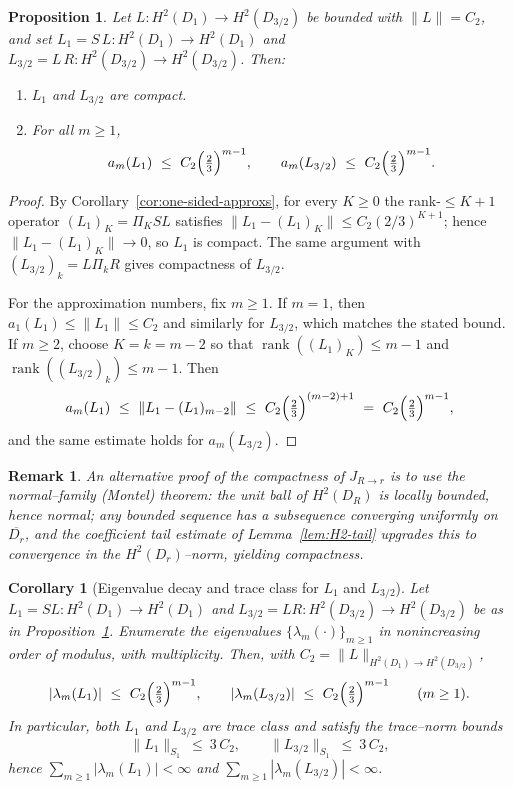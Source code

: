 \documentclass[11pt]{article}
\newtheorem{remark}[definition]{Remark}
\newtheorem{proposition}[definition]{Proposition}
\newtheorem{corollary}[definition]{Corollary}
\begin{document}
\begin{proposition}
\label{prop:L-on-each-space}
Let $L:H^2(D_1)\to H^2(D_{3/2})$ be bounded with $\|L\|=C_2$, and set
$L_{1}=S\,L:H^2(D_1)\to H^2(D_1)$ and $L_{3/2}=L\,R:H^2(D_{3/2})\to H^2(D_{3/2})$.
Then:
\begin{enumerate}
\item $L_{1}$ and $L_{3/2}$ are compact.
\item For all $m\ge1$,
\[
a_m(L_{1})\ \le\ C_2\Bigl(\tfrac{2}{3}\Bigr)^{m-1},
\qquad
a_m(L_{3/2})\ \le\ C_2\Bigl(\tfrac{2}{3}\Bigr)^{m-1}.
\]
\end{enumerate}
\end{proposition}
\begin{proof}
By Corollary~\ref{cor:one-sided-approxs}, for every $K\ge0$ the rank-$\le K+1$
operator $(L_{1})_{K}=\Pi_K S L$ satisfies
$\|L_{1}-(L_{1})_{K}\|\le C_2(2/3)^{K+1}$; hence $\|L_{1}-(L_{1})_{K}\|\to0$,
so $L_{1}$ is compact. The same argument with $(L_{3/2})_{k}=L\Pi_k R$
gives compactness of $L_{3/2}$.

For the approximation numbers, fix $m\ge1$. If $m=1$, then
$a_1(L_{1})\le\|L_{1}\|\le C_2$ and similarly for $L_{3/2}$, which matches the
stated bound. If $m\ge2$, choose $K=k=m-2$ so that
$\operatorname{rank}((L_{1})_{K})\le m-1$ and $\operatorname{rank}((L_{3/2})_{k})\le m-1$.
Then
\[
a_m(L_{1})\ \le\ \|L_{1}-(L_{1})_{m-2}\|
\ \le\ C_2\Bigl(\tfrac{2}{3}\Bigr)^{(m-2)+1}
\ =\ C_2\Bigl(\tfrac{2}{3}\Bigr)^{m-1},
\]
and the same estimate holds for $a_m(L_{3/2})$.
\end{proof}

\begin{remark}
An alternative proof of the compactness of $J_{R\to r}$ is to use the normal–family
(Montel) theorem: the unit ball of $H^2(D_R)$ is locally bounded, hence normal; any
bounded sequence has a subsequence converging uniformly on $\overline{D_r}$, and the
coefficient tail estimate of Lemma~\ref{lem:H2-tail} upgrades this to convergence in
the $H^2(D_r)$–norm, yielding compactness.
\end{remark}

\begin{corollary}[Eigenvalue decay and trace class for $L_{1}$ and $L_{3/2}$]
\label{cor:eig-decay-traceclass}
Let $L_{1}=SL:H^2(D_1)\to H^2(D_1)$ and $L_{3/2}=LR:H^2(D_{3/2})\to H^2(D_{3/2})$
be as in Proposition~\ref{prop:L-on-each-space}. Enumerate the eigenvalues
$\{\lambda_m(\cdot)\}_{m\ge1}$ in nonincreasing order of modulus, with multiplicity.
Then, with $C_2=\|L\|_{H^2(D_1)\to H^2(D_{3/2})}$,
\[
|\lambda_m(L_{1})|\ \le\ C_2\Bigl(\tfrac{2}{3}\Bigr)^{m-1},
\qquad
|\lambda_m(L_{3/2})|\ \le\ C_2\Bigl(\tfrac{2}{3}\Bigr)^{m-1}
\qquad(m\ge1).
\]
In particular, both $L_{1}$ and $L_{3/2}$ are trace class and satisfy the trace–norm bounds
\[
\|L_{1}\|_{S_1}\ \le\ 3\,C_2,
\qquad
\|L_{3/2}\|_{S_1}\ \le\ 3\,C_2,
\]
hence $\displaystyle \sum_{m\ge1}|\lambda_m(L_{1})|<\infty$ and
$\displaystyle \sum_{m\ge1}|\lambda_m(L_{3/2})|<\infty$.
\end{corollary}
\end{document}
